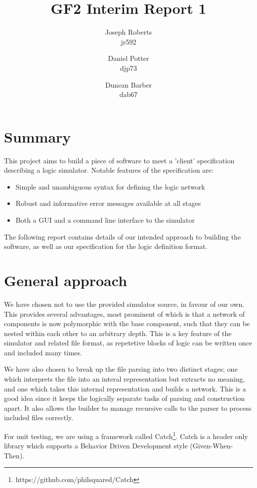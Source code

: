 \documentclass[a4paper]{article}
\author{Joseph Roberts \\
        \small{jr592}
        \and
        Daniel Potter\\
        \small{djp73}
        \and
        Duncan Barber \\
        \small{dab67}
       }
\title{GF2 Interim Report 1}
\begin{document}
\nocite{*}
\maketitle

\section{Summary}
    This project aims to build a piece of software to meet a 'client' specification describing a logic simulator. Notable features of the specification are:
    \begin{itemize}
        \item Simple and unambiguous syntax for defining the logic network
        \item Robust and informative error messages available at all stages
        \item Both a GUI and a command line interface to the simulator
    \end{itemize}

    The following report contains details of our intended approach to building the software, as well as our specification for the logic definition format.

\section{General approach}
\label{sec:general}
    We have chosen not to use the provided simulator source, in favour of our own. This provides several advantages, most prominent of which is that a network of components is now polymorphic with the base component, such that they can be nested within each other to an arbitrary depth. This is a key feature of the simulator and related file format, as repetetive blocks of logic can be written once and included many times.

    We have also chosen to break up the file parsing into two distinct stages; one which interprets the file into an interal representation but extracts no meaning, and one which takes this internal representation and builds a network. This is a good idea since it keeps the logically separate tasks of parsing and construction apart. It also allows the builder to manage recursive calls to the parser to process included files correctly.

    For unit testing, we are using a framework called Catch\footnote{https://github.com/philsquared/Catch}. Catch is a header only library which supports a Behavior Driven Development style (Given-When-Then).
\end{document}
